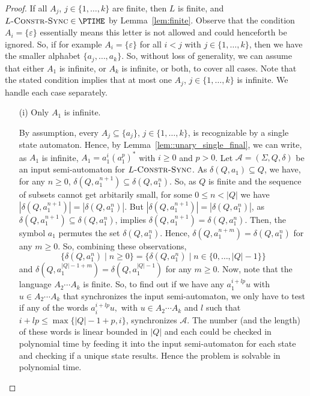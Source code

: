 \begin{proof}
 If all $A_j$, $j \in \{1,\ldots,k\}$ are finite, then $L$ is finite, and $L\textsc{-Constr-Sync}\in \PTIME$
 by Lemma~\ref{lem:finite}.
 Observe that the condition $A_i = \{\varepsilon\}$
 essentially means this letter is not allowed and could henceforth be ignored.
 So, if for example $A_i = \{\varepsilon\}$
 for all $i < j$ with $j \in \{1,\ldots,k\}$,
 then we have the
 smaller alphabet $\{ a_j, \ldots, a_k\}$.
 So, without loss of generality, we can assume
 that either $A_1$ is infinite, or $A_k$ is infinite,
 or both, to cover all cases. Note that the stated condition
 implies that at most one $A_j$, $j \in \{1,\ldots,k\}$
 is infinite.
 We handle each case separately.
 
 \begin{enumerate}
 \item[(i)] Only $A_1$ is infinite.
  
  By assumption, every $A_j \subseteq \{a_j\}$, $j \in \{1,\ldots,k\}$,
  is recognizable by a single state automaton. Hence, by Lemma~\ref{lem::unary_single_final}, we can write, as $A_1$ is infinite,
   $A_1 = a_1^i (a_1^p)^*$ with $i \ge 0$ and $p > 0$.
  Let $\mathcal A = (\Sigma, Q, \delta)$ be an input semi-automaton
  for $L\textsc{-Constr-Sync}$.
  As $\delta(Q, a_1) \subseteq Q$,
  we have, for any $n \ge 0$, $\delta(Q, a_1^{n+1}) \subseteq \delta(Q, a_1^n)$.
  So, as $Q$ is finite and the sequence of subsets
  cannot get arbitarily small, for some $0 \le n < |Q|$
  we have $|\delta(Q, a_1^{n+1})| = |\delta(Q, a_1^n)|$.
  But $|\delta(Q, a_1^{n+1})| = |\delta(Q, a_1^n)|$,
  as $\delta(Q, a_1^{n+1}) \subseteq \delta(Q, a_1^n)$,
  implies $\delta(Q, a_1^{n+1}) = \delta(Q, a_1^n)$.
  Then, the symbol $a_1$
  permutes the set $\delta(Q, a_1^n)$.
  Hence, $\delta(Q, a_1^{n+m}) = \delta(Q, a_1^n)$ for any $m \ge 0$.
  So, combining these observations,
  \begin{equation}\label{eqn:case_one_P}
   \{ \delta(Q, a_1^n) \mid n \ge 0 \} = \{ \delta(Q, a_1^n) \mid n \in \{0,\ldots, |Q|-1\} \}
  \end{equation}
  and $\delta(Q, a_1^{|Q| - 1 + m}) = \delta(Q, a_1^{|Q|-1})$
  for any $m \ge 0$. 
  Now, note that the language $A_2 \cdots A_k$
  is finite. So, to find out if we have any
  $a_1^{i + lp} u$ with $u \in A_2 \cdots A_k$
  that synchronizes the input semi-automaton,
  we only have to test if any of the words
  $
   a_i^{i + lp} u,
  $
  with $u \in A_2 \cdots A_k$
  and $l$ such that $i + lp \le \max\{|Q|-1 + p, i\}$,
  synchronizes $\mathcal A$.
  The number (and the length) of these words is linear bounded in $|Q|$ 
  and each could be checked in polynomial time by 
  feeding it into the input semi-automaton for each state and checking
  if a unique state results.
  Hence the problem is solvable in polynomial time.
   

\end{enumerate}
\end{proof}
